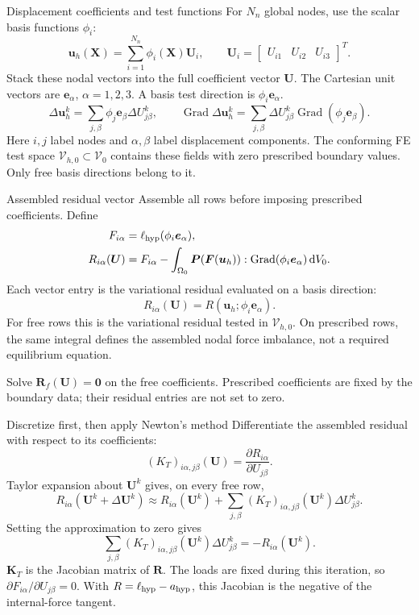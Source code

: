\documentclass[11pt,aspectratio=169]{beamer}
\newcommand{\bu}{\bm u}
\newcommand{\bF}{\bm F}
\newcommand{\bP}{\bm P}
\newcommand{\bX}{\bm X}
\newcommand{\bU}{\bm U}
\newcommand{\bR}{\bm R}
\newcommand{\bK}{\bm K}
\newcommand{\Grad}{\operatorname{Grad}}
\newcommand{\Vzero}{\mathcal V_0}
\newcommand{\Vhzero}{\mathcal V_{h,0}}
\begin{document}
\begin{frame}{Displacement coefficients and test functions}
For $N_n$ global nodes, use the scalar basis functions $\phi_i$:
\[
\bu_h(\bX)=\sum_{i=1}^{N_n}\phi_i(\bX)\bm U_i,
\qquad
\bm U_i=\begin{bmatrix}U_{i1}&U_{i2}&U_{i3}\end{bmatrix}^{T}.
\]
Stack these nodal vectors into the full coefficient vector $\bU$.
The Cartesian unit vectors are $\bm e_\alpha$, $\alpha=1,2,3$.
A basis test direction is $\phi_i\bm e_\alpha$.
\[
\Delta\bu_h^k=\sum_{j,\beta}\phi_j\bm e_\beta\Delta U_{j\beta}^k,
\qquad
\Grad\Delta\bu_h^k
=\sum_{j,\beta}\Delta U_{j\beta}^k
\Grad(\phi_j\bm e_\beta).
\]
Here $i,j$ label nodes and $\alpha,\beta$ label displacement components.
The conforming FE test space $\Vhzero\subset\Vzero$ contains these fields
with zero prescribed boundary values. Only free basis directions belong to it.
\end{frame}

\begin{frame}{Assembled residual vector}
Assemble all rows before imposing prescribed coefficients. Define
\[
\begin{aligned}
F_{i\alpha}&=\ell_{\rm hyp}(\phi_i\bm e_\alpha),\\
R_{i\alpha}(\bU)
&=F_{i\alpha}-\int_{\Omega_0}\bP(\bF(\bu_h)):
\Grad(\phi_i\bm e_\alpha)\,\mathrm dV_0.
\end{aligned}
\]
Each vector entry is the variational residual evaluated on a basis direction:
\[
\boxed{R_{i\alpha}(\bU)=R(\bu_h;\phi_i\bm e_\alpha).}
\]
For free rows this is the variational residual tested in $\Vhzero$.
On prescribed rows, the same integral defines the assembled nodal force
imbalance, not a required equilibrium equation.

Solve $\bR_f(\bU)=\bm0$ on the free coefficients. Prescribed coefficients
are fixed by the boundary data; their residual entries are not set to zero.
\end{frame}

\begin{frame}{Discretize first, then apply Newton's method}
Differentiate the assembled residual with respect to its coefficients:
\[
(K_T)_{i\alpha,j\beta}(\bU)
=\frac{\partial R_{i\alpha}}{\partial U_{j\beta}}.
\]
Taylor expansion about $\bU^k$ gives, on every free row,
\[
R_{i\alpha}(\bU^k+\Delta\bU^k)
\approx R_{i\alpha}(\bU^k)
+\sum_{j,\beta}(K_T)_{i\alpha,j\beta}(\bU^k)
\Delta U_{j\beta}^k.
\]
Setting the approximation to zero gives
\[
\boxed{\sum_{j,\beta}(K_T)_{i\alpha,j\beta}(\bU^k)
\Delta U_{j\beta}^k=-R_{i\alpha}(\bU^k).}
\]
$\bK_T$ is the Jacobian matrix of $\bR$. The loads are fixed during this
iteration, so $\partial F_{i\alpha}/\partial U_{j\beta}=0$.
With $R=\ell_{\rm hyp}-a_{\rm hyp}$, this Jacobian is the negative of
the internal-force tangent.
\end{frame}
\end{document}
